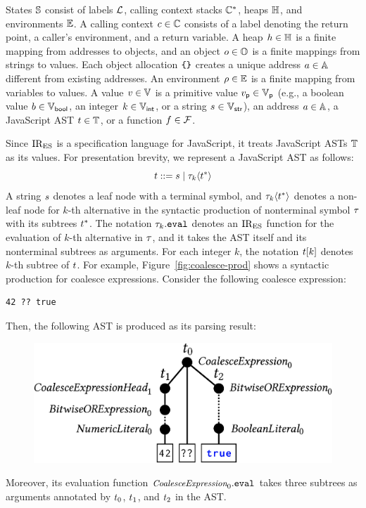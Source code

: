 States $\mathbb{S}$ consist of labels $\mathcal{L}$, calling context stacks
$\mathbb{C}^*$, heaps $\mathbb{H}$, and environments $\mathbb{E}$.  A calling context
$c \in \mathbb{C}$ consists of a label denoting the return point, a caller's
environment, and a return variable.  A heap $h \in \mathbb{H}$ is a finite
mapping from addresses to objects, and an object $o \in \mathbb{O}$ is a finite
mappings from strings to values.  Each object allocation $\texttt{\{} \texttt{\}}$ creates a
unique address $a \in \mathbb{A}$ different from existing addresses.  An
environment $\rho \in \mathbb{E}$ is a finite mapping from variables to values. A
value $v \in \mathbb{V}$ is a primitive value $v_{\textsf{p}} \in \mathbb{V}_{\textsf{p}}$ (e.g., a
boolean value $b \in \mathbb{V}_{\textsf{bool}}$, an integer $k \in \mathbb{V}_{\textsf{int}}$, or a string
$s \in \mathbb{V}_{\textsf{str}}$), an address $a \in \mathbb{A}$, a JavaScript AST $t
\in \mathbb{T}$, or a function $f \in \mathcal{F}$.

Since $\text{IR}_\text{ES}$ is a specification language for JavaScript, it treats JavaScript
ASTs $\mathbb{T}$ as its values. For presentation brevity, we represent a JavaScript
AST as follows:
\[
  t ::= s \mid \tau_k \langle t^* \rangle
\]
A string $s$ denotes a leaf node with a terminal symbol, and $\tau_k \langle
t^* \rangle$ denotes a non-leaf node for $k$-th alternative in the syntactic
production of nonterminal symbol $\tau$ with its subtrees $t^*$.  The notation
$\tau_k.\texttt{eval}$ denotes an $\text{IR}_\text{ES}$ function for the evaluation of $k$-th
alternative in $\tau$, and it takes the AST itself and its nonterminal subtrees
as arguments. For each integer $k$, the notation $t[k]$ denotes $k$-th
subtree of $t$.  For example, Figure~\ref{fig:coalesce-prod} shows a
syntactic production for coalesce expressions.  Consider the following coalesce
expression:
\begin{lstlisting}[style=JS]
                    42 ?? true
\end{lstlisting}
Then, the following AST is produced as its parsing result:
\begin{figure}[H]
  \includegraphics[width=.8\columnwidth]{img/ast-example.png}
\end{figure}
\noindent Moreover, its evaluation function $\textit{\small CoalesceExpression}_0.\texttt{eval}$
takes three subtrees as arguments annotated by $t_0$, $t_1$, and
$t_2$ in the AST.


